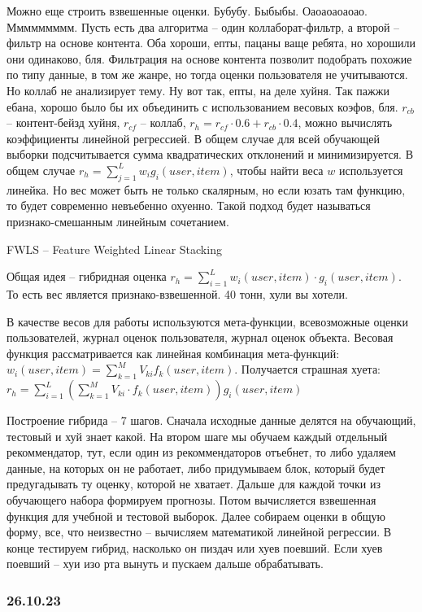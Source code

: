Можно еще строить взвешенные оценки. Бубубу. Быбыбы. Оаоаоаоаоао. Ммммммммм. Пусть есть два алгоритма -- один коллаборат-фильтр, а второй -- фильтр на основе контента. Оба хороши, епты, пацаны ваще ребята, но хорошили они одинаково, бля. Фильтрация на основе контента позволит подобрать похожие по типу данные, в том же жанре, но тогда оценки пользователя не учитываются. Но коллаб не анализирует тему. Ну вот так, епты, на деле хуйня. Так пажжи ебана, хорошо было бы их объединить с использованием весовых коэфов, бля. $r_{cb}$ -- контент-бейзд хуйня, $r_{cf}$ -- коллаб, $r_{h} = r_{cf} \cdot 0.6 + r_{cb} \cdot 0.4$, можно вычислять коэффициенты линейной регрессией. В общем случае для всей обучающей выборки подсчитывается сумма квадратических отклонений и минимизируется. В общем случае $r_h = \sum_{j=1}^{L}{w_i g_i(user, item)}$, чтобы найти веса $w$ используется линейка. Но вес может быть не только скалярным, но если юзать там функцию, то будет современно невъебенно охуенно. Такой подход будет называться признако-смешанным линейным сочетанием.

FWLS -- Feature Weighted Linear Stacking

Общая идея -- гибридная оценка $r_h = \sum^{L}_{i=1}{w_i(user,item)\cdot g_i(user, item)}$. То есть вес является признако-взвешенной. 40 тонн, хули вы хотели.

В качестве весов для работы используются мета-функции, всевозможные оценки пользователей, журнал оценок пользователя, журнал оценок объекта. Весовая функция рассматривается как линейная комбинация мета-функций: $w_i(user, item) = \sum_{k=1}^{M}{V_{ki}f_k(user,item)}$. Получается страшная хуета: $r_h = \sum^{L}_{i = 1}{(\sum_{k=1}^{M}{V_{ki} \cdot f_k(user, item)}) g_i (user, item)}$

Построение гибрида -- 7 шагов. Сначала исходные данные делятся на обучающий, тестовый и хуй знает какой. На втором шаге мы обучаем каждый отдельный рекоммендатор, тут, если один из рекоммендаторов отъебнет, то либо удаляем данные, на которых он не работает, либо придумываем блок, который будет предугадывать ту оценку, которой не хватает. Дальше для каждой точки из обучающего набора формируем прогнозы. Потом вычисляется взвешенная функция для учебной и тестовой выборок. Далее собираем оценки в общую форму, все, что неизвестно -- вычисляем математикой линейной регрессии. В конце тестируем гибрид, насколько он пиздач или хуев поевший. Если хуев поевший -- хуи изо рта вынуть и пускаем дальше обрабатывать.

\subsubsection{26.10.23}

